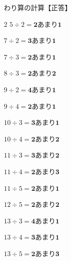 \documentclass[paper=a4, fontsize=11pt, jafontsize=11pt]{jlreq}
\begin{document}
\begin{center}
    {\Large わり算の計算【正答】} \\
\vspace*{3ex}
\begin{multicols*}{2}
$ 5 \div 2 = \bm{2} 　あまり　 \bm{1}$ \vspace*{\fill} 

$ 7 \div 2 = \bm{3} 　あまり　 \bm{1}$ \vspace*{\fill} 

$ 7 \div 3 = \bm{2} 　あまり　 \bm{1}$ \vspace*{\fill} 

$ 8 \div 3 = \bm{2} 　あまり　 \bm{2}$ \vspace*{\fill} 

$ 9 \div 2 = \bm{4} 　あまり　 \bm{1}$ \vspace*{\fill} 

$ 9 \div 4 = \bm{2} 　あまり　 \bm{1}$ \vspace*{\fill} 

$ 10 \div 3 = \bm{3} 　あまり　 \bm{1}$ \vspace*{\fill} 

$ 10 \div 4 = \bm{2} 　あまり　 \bm{2}$ \vspace*{\fill} 

$ 11 \div 3 = \bm{3} 　あまり　 \bm{2}$ \vspace*{\fill} 

$ 11 \div 4 = \bm{2} 　あまり　 \bm{3}$ \vspace*{\fill} 

\columnbreak 
$ 11 \div 5 = \bm{2} 　あまり　 \bm{1}$ \vspace*{\fill} 

$ 12 \div 5 = \bm{2} 　あまり　 \bm{2}$ \vspace*{\fill} 

$ 13 \div 3 = \bm{4} 　あまり　 \bm{1}$ \vspace*{\fill} 

$ 13 \div 4 = \bm{3} 　あまり　 \bm{1}$ \vspace*{\fill} 

$ 13 \div 5 = \bm{2} 　あまり　 \bm{3}$ \vspace*{\fill} 


\end{multicols*}
\end{center}
\end{document}
